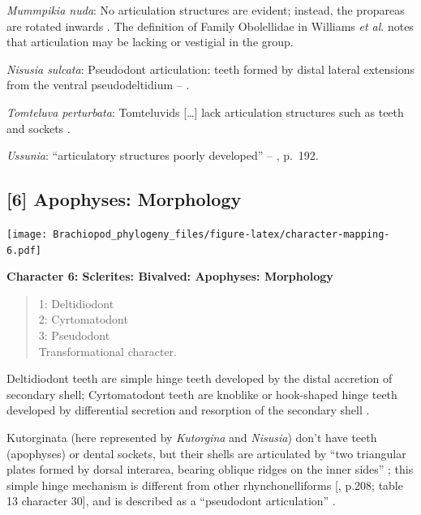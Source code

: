 \documentclass[openany]{book}
\theoremstyle{definition}
\theoremstyle{definition}
\theoremstyle{definition}
\theoremstyle{remark}
\begin{document}
\hypertarget{Mummpikia_nuda-coding-5}{}
\emph{Mummpikia nuda}: No articulation structures are evident; instead,
the propareas are rotated inwards \citep{Balthasar2008iMummpikia}. The
definition of Family Obolellidae in Williams \emph{et al}.
\citeyearpar{Williams2000LinguliformeaCraniiformea} notes that
articulation may be lacking or vestigial in the group.

\hypertarget{Nisusia_sulcata-coding-5}{}
\emph{Nisusia sulcata}: Pseudodont articulation: teeth formed by distal
lateral extensions from the ventral pseudodeltidium --
\citet{Holmer2018Evolutionarysignificance}.

\hypertarget{Tomteluva_perturbata-coding-5}{}
\emph{Tomteluva perturbata}: Tomteluvids {[}\ldots{}{]} lack
articulation structures such as teeth and sockets
\citep{Streng2016Anew}.

\hypertarget{Ussunia-coding-5}{}
\emph{Ussunia}: ``articulatory structures poorly developed'' --
\citet{Williams2000LinguliformeaCraniiformea}, p.~192.

\subsection*{{[}6{]} Apophyses: Morphology}\label{apophyses-morphology}

\texttt{[image: Brachiopod\_phylogeny\_files/figure-latex/character-mapping-6.pdf]}

\textbf{Character 6: Sclerites: Bivalved: Apophyses: Morphology}

\begin{quote}
1: Deltidiodont\\
2: Cyrtomatodont\\
3: Pseudodont\\
Transformational character.
\end{quote}

Deltidiodont teeth are simple hinge teeth developed by the distal
accretion of secondary shell; Cyrtomatodont teeth are knoblike or
hook-shaped hinge teeth developed by differential secretion and
resorption of the secondary shell \citep[fig. 322
in][]{Williams2000LinguliformeaCraniiformea}.

Kutorginata (here represented by \emph{Kutorgina} and \emph{Nisusia})
don't have teeth (apophyses) or dental sockets, but their shells are
articulated by ``two triangular plates formed by dorsal interarea,
bearing oblique ridges on the inner sides''
\citep[p.~211]{Williams2000LinguliformeaCraniiformea}; this simple hinge
mechanism is different from other rhynchonelliforms
{[}\citet{Williams2000LinguliformeaCraniiformea}, p.208; table 13
character 30{]}, and is described as a ``pseudodont articulation''
\citep{Holmer2018Evolutionarysignificance}.
\end{document}
